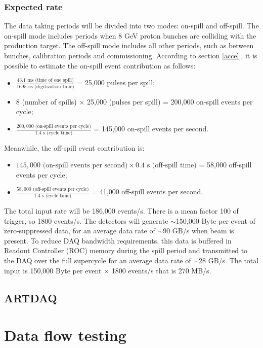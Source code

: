 \subsubsection{Expected rate}
The data taking periods will be divided into two modes: on-spill and off-spill. The on-spill mode includes periods when 8 GeV 
proton bunches are colliding with the production target. The off-spill mode includes all other periods, such as between bunches, calibration periods and commissioning.
According to section \ref{accel}, it is possible to estimate the on-spill event contribution as follows:
\begin{itemize}
    \item $\frac{43.1 \text{ ms (time of one spill)}}{1695 \text{ ns (digitization time)}}$ = 25,000 pulses per spill;
    \item 8 (number of spills) $\times$ 25,000 (pulses per spill) = 200,000 on-spill events per cycle;
    \item $\frac{200,000 \text{ (on-spill events per cycle)}}{1.4 \text{ s (cycle time)}}$ = 145,000 on-spill events per second.
\end{itemize}
Meanwhile, the off-spill event contribution is:
\begin{itemize}
    \item $145,000 \text{ (on-spill events per second)} \times 0.4 \text{ s (off-spill time)}$ = 58,000 off-spill events per cycle;
    \item $\frac{58,000 \text{ (off-spill events per cycle)}}{1.4 \text{ s (cycle time)}}$ = 41,000 off-spill events per second.
\end{itemize}
The total input rate will be 186,000 events/s. %
There is a mean factor 100 of trigger, so 1800 events/s.
The detectors will generate $\sim$150,000 Byte per event of zero-suppressed data, for an average data rate of $\sim$90 GB/s when beam is present. 
To reduce DAQ bandwidth requirements, this data is buffered in Readout Controller (ROC) memory during the spill period and transmitted to the 
DAQ over the full supercycle for an average data rate of $\sim$28 GB/s.
The total input is 150,000 Byte per event $\times$ 1800 events/s that is 270 MB/s.
\subsection{ARTDAQ}
\section{Data flow testing}
